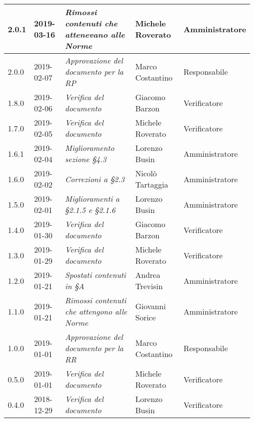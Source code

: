 \begin{longtable}{C{2cm}|C{2.5cm}|C{4.5cm}|C{2.5cm}|C{3cm}}
		2.0.1 & 2019-03-16 & \emph{Rimossi contenuti che attenevano alle Norme} & Michele Roverato & Amministratore \\
		\hline
	
		2.0.0 & 2019-02-07 & \emph{Approvazione del documento per la RP} & Marco Costantino & Responsabile \\
		\hline
	
		1.8.0 & 2019-02-06 & \emph{Verifica del documento} & Giacomo Barzon & Verificatore \\
		\hline
		
		1.7.0 & 2019-02-05 & \emph{Verifica del documento} & Michele Roverato & Verificatore \\
		\hline
	
		1.6.1 & 2019-02-04 & \emph{Miglioramento sezione §4.3} & Lorenzo Busin & Amministratore \\
		\hline
		
		1.6.0 & 2019-02-02 & \emph{Correzioni a §2.3} & Nicolò Tartaggia & Amministratore \\
		\hline
	
		1.5.0 & 2019-02-01 & \emph{Miglioramenti a  §2.1.5 e §2.1.6} & Lorenzo Busin & Amministratore \\
		\hline
	
		1.4.0 & 2019-01-30 & \emph{Verifica del documento} & Giacomo Barzon & Verificatore \\
		\hline
		
		1.3.0 & 2019-01-29 & \emph{Verifica del documento} & Michele Roverato & Verificatore \\
		\hline
		
		1.2.0 & 2019-01-21 & \emph{Spostati contenuti in §A} & Andrea Trevisin & Amministratore \\
		\hline
	
		1.1.0 & 2019-01-21 & \emph{Rimossi contenuti che attengono alle Norme} & Giovanni Sorice & Amministratore \\
		\hline
		
		1.0.0 & 2019-01-01 & \emph{Approvazione del documento per la RR} & Marco Costantino & Responsabile \\
		\hline
		
		0.5.0 & 2019-01-01 & \emph{Verifica del documento} & Michele Roverato & Verificatore \\
		\hline
		
		0.4.0 & 2018-12-29 & \emph{Verifica del documento} & Lorenzo Busin & Verificatore \\
		\hline
		

\end{longtable}
